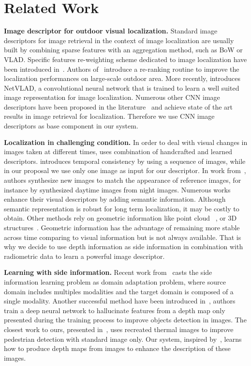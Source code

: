 \section{Related Work}
\label{sec:related_work}

\vspace{4pt}\noindent\textbf{Image descriptor for outdoor visual localization.} Standard image descriptors for image retrieval in the context of image localization are usually built by combining sparse features with an aggregation method, such as BoW or VLAD. Specific features re-weighting scheme dedicated to image localization have been introduced in~\cite{Arandjelovic2014}. Authors of~\cite{Sattler2016} introduce a re-ranking routine to improve the localization performances on large-scale outdoor area. More recently, \cite{Arandjelovic2017} introduces NetVLAD, a convolutional neural network that is trained to learn a well suited image representation for image localization. Numerous other CNN image descriptors have been proposed in the literature~\cite{Kim2017a,Gordo2017,Radenovic2017,Sunderhauf2015a,Liu2018} and achieve state of the art results in image retrieval for localization. Therefore we use CNN image descriptors as base component in our system.

\vspace{4pt}\noindent\textbf{Localization in challenging condition.} In order to deal with visual changes in images taken at different times, \cite{Naseer2018} uses combination of handcrafted and learned descriptors. \cite{Garg2018} introduces temporal consistency by using a sequence of images, while in our proposal we use only one image as input for our descriptor. In work from~\cite{Porav2018}, authors synthesize new images to match the appearance of reference images, for instance by synthesized daytime images from night images. Numerous works~\cite{Stenborg2018,Toft2018,Naseer2017a} enhance their visual descriptors by adding semantic information. Although semantic representation is robust for long term localization, it may be costly to obtain. Other methods rely on geometric information like point cloud~\cite{Sattler2018,Schonberger2018} , or 3D structures~\cite{Torii2015}. Geometric information has the advantage of remaining more stable across time comparing to visual information but is not always available. That is why we decide to use depth information as side information in combination with radiometric data to learn a powerful image descriptor.

\vspace{4pt}\noindent\textbf{Learning with side information.} Recent work from~\cite{Li2017b} casts the side information learning problem as domain adaptation problem, where source domain includes multiples modalities and the target domain is composed of a single modality. Another successful method have been introduced in~\cite{Hoffman2016}, authors train a deep neural network to hallucinate features from a depth map only presented during the training process to improve objects detection in images. The closest work to ours, presented in~\cite{xu2017learning}, uses recreated thermal images to improve pedestrian detection with standard image only. Our system, inspired by~\cite{xu2017learning}, learns how to produce depth maps from images to enhance the description of these images.
